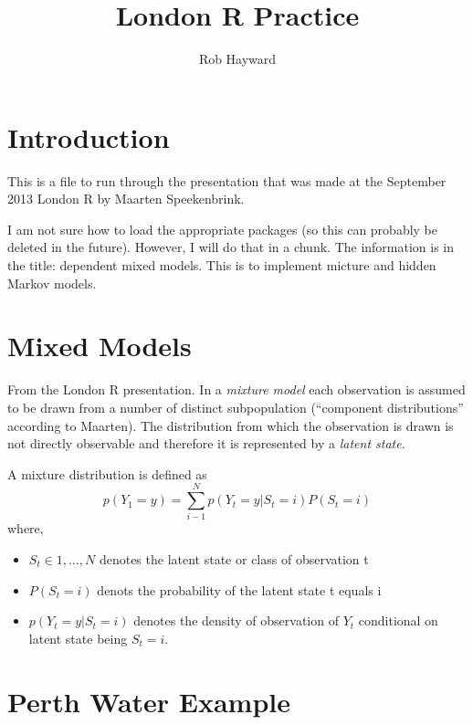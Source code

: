 \documentclass{article}\usepackage{graphicx, color}
\begin{document}
\title{London R Practice}
\author{Rob Hayward}
\maketitle
\section{Introduction}

This is a file to run through the presentation that was made at the September 2013 London R by Maarten Speekenbrink.  

I am not sure how to load the appropriate packages (so this can probably be deleted in the future).  However, I will do that in a chunk. The information is in the title:  dependent mixed models. This is to implement micture and hidden Markov models. 


\section{Mixed Models}
From the London R presentation. In a \emph{mixture model} each observation is assumed to be drawn from a number of distinct subpopulation (``component distributions'' according to Maarten).  The distribution from which the observation is drawn is not directly observable and therefore it is represented by a \emph{latent state}.  

A mixture distribution is defined as 
\begin{equation}
p(Y_1 = y) = \sum_{i - 1}^N p(Y_t = y|S_t = i)P(S_t = i)
\end{equation}
where,
\begin{itemize}
\item $S_t \in {1, \dots, N}$ denotes the latent state or class of observation t
\item $P(S_t = i)$ denots the probability of the latent state t equals i 
\item $p(Y_t = y|S_t = i)$ denotes the density of observation of $Y_t$ conditional on latent state being $S_t = i$.
\end{itemize}
\section{Perth Water Example}
\end{document}
